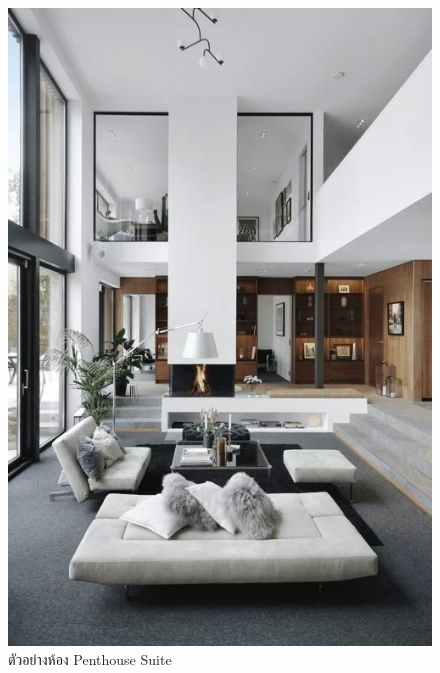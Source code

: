 \documentclass{report}
\begin{document}
\begin{figure}
    \centering
    \includegraphics[scale=0.2]{Penthouse.jpg}
    \caption{ตัวอย่างห้อง Penthouse Suite}
    \label{fig:graph11}
\end{figure}

\pagebreak
\end{document}
